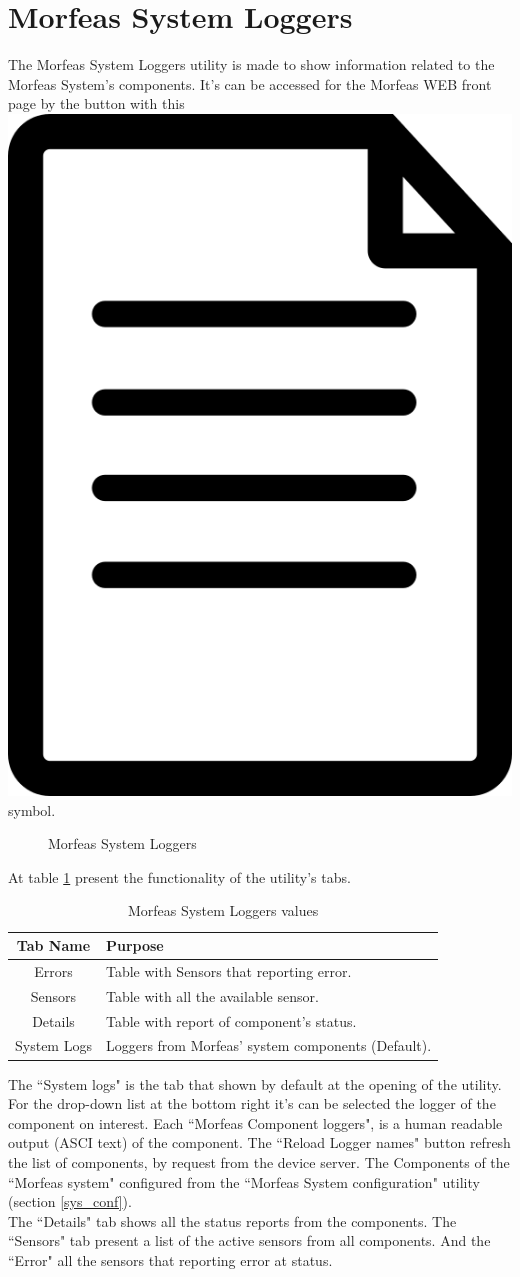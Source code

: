 \section{Morfeas System Loggers}
The Morfeas System Loggers utility is made to show information related to the Morfeas System's components.
It's can be accessed for the Morfeas WEB front page by the button with this \includegraphics[height=.125in]{../art/logger.png} symbol.
\begin{figure}[h]
\centering
	\caption{Morfeas System Loggers}
	\label{fig:morfeas_loggers}
\end{figure}

At table \ref{tab:morfeas_loggers} present the functionality of the utility's tabs.
\begin{table}[h!]
	\begin{center}
		\begin{tabular}{|c|l|}
			\hline
			\textbf{Tab Name} & \textbf{Purpose}\\
			\hline
			Errors & Table with Sensors that reporting error.\\
			\hline
			Sensors & Table with all the available sensor.\\
			\hline
			Details & Table with report of component's status.\\
			\hline
			System Logs & Loggers from Morfeas' system components (Default).\\
			\hline
		\end{tabular}
		\caption{Morfeas System Loggers values}
		\label{tab:morfeas_loggers}
	\end{center}
\end{table}

The ``System logs" is the tab that shown by default at the opening of the utility.
For the drop-down list at the bottom right it's can be selected the logger of the component on interest.
Each ``Morfeas Component loggers", is a human readable output (ASCI text) of the component.
The ``Reload Logger names" button refresh the list of components, by request from the device server.
The Components of the ``Morfeas system" configured from the ``Morfeas System configuration" utility (section \ref{sys_conf}).\\

The ``Details" tab shows all the status reports from the components.
The ``Sensors" tab present a list of the active sensors from all components.
And the ``Error" all the sensors that reporting error at status.

